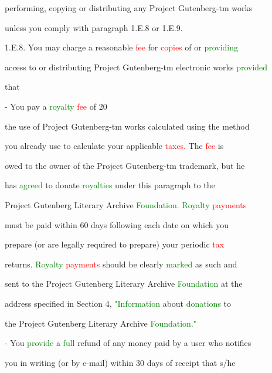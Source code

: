  performing, copying or distributing any Project Gutenberg-tm works

 unless you comply with paragraph 1.E.8 or 1.E.9.



 1.E.8. You may charge a reasonable \textcolor{red}{fee} for \textcolor{red}{copies} of or \textcolor{green}{providing}

 access to or distributing Project Gutenberg-tm electronic works \textcolor{green}{provided}

 that



 - You \textcolor{BurntOrange}{pay} a \textcolor{green}{royalty} \textcolor{red}{fee} of 20%

 the use of Project Gutenberg-tm works calculated using the method

 you already use to calculate your applicable \textcolor{red}{taxes.} The \textcolor{red}{fee} is

 owed to the owner of the Project Gutenberg-tm trademark, but he

 has \textcolor{green}{agreed} to donate \textcolor{green}{royalties} under this paragraph to the

 Project Gutenberg Literary Archive \textcolor{green}{Foundation.} \textcolor{green}{Royalty} \textcolor{red}{payments}

 must be paid within 60 days following each date on which you

 \textcolor{BurntOrange}{prepare} (or are legally required to \textcolor{BurntOrange}{prepare)} your periodic \textcolor{red}{tax}

 returns. \textcolor{green}{Royalty} \textcolor{red}{payments} should be clearly \textcolor{green}{marked} as such and

 sent to the Project Gutenberg Literary Archive \textcolor{green}{Foundation} at the

 address specified in Section 4, \textcolor{green}{"Information} about \textcolor{green}{donations} to

 the Project Gutenberg Literary Archive \textcolor{green}{Foundation."}



 - You \textcolor{green}{provide} a \textcolor{green}{full} refund of any \textcolor{BurntOrange}{money} paid by a user who notifies

 you in writing (or by e-mail) within 30 days of receipt that s/he

